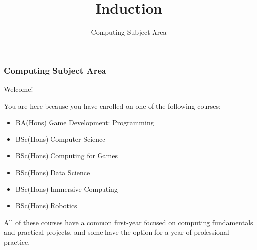 \usepackage{../../beamerthemeFalmouthGamesAcademy}
\usepackage{multimedia}
\graphicspath{ {../../} }


\usepackage[normalem]{ulem}
\usepackage{wasysym}
\usepackage[T1]{fontenc}
\usepackage{pdfpages}

\usetikzlibrary{arrows,automata}





\title{Induction}
\subtitle{Computing Subject Area}

\frame{\titlepage} 

\begin{frame}
	\frametitle{Computing Subject Area}
	
	Welcome!
	
	\vspace{1em}
	
	You are here because you have enrolled on one of the following courses:
	
	\vspace{0.2em}
	
	\begin{itemize}
		\item BA(Hons) Game Development: Programming
		\item BSc(Hons) Computer Science
		\item BSc(Hons) Computing for Games
		\item BSc(Hons) Data Science
		\item BSc(Hons) Immersive Computing
		\item BSc(Hons) Robotics
	\end{itemize}
	
	\vspace{1em}
	
	All of these courses have a common first-year focused on computing fundamentals and practical projects, and some have the option for a year of professional practice.

\end{frame}

